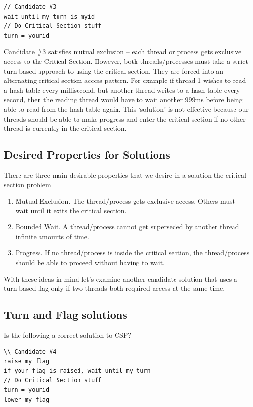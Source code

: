 \begin{lstlisting}
// Candidate #3
wait until my turn is myid
// Do Critical Section stuff
turn = yourid
\end{lstlisting}

Candidate \#3 satisfies mutual exclusion -- each thread or process gets exclusive access to the Critical Section.
However, both threads/processes must take a strict turn-based approach to using the critical section.
They are forced into an alternating critical section access pattern.
For example if thread 1 wishes to read a hash table every millisecond, but another thread writes to a hash table every second, then the reading thread would have to wait another 999ms before being able to read from the hash table again.
This `solution' is not effective because our threads should be able to make progress and enter the critical section if no other thread is currently in the critical section.

\subsection{Desired Properties for Solutions}

There are three main desirable properties that we desire in a solution the critical section problem

\begin{enumerate}
\item Mutual Exclusion. The thread/process gets exclusive access.
  Others must wait until it exits the critical section.
\item Bounded Wait. A thread/process cannot get superseded by another thread infinite amounts of time.
\item Progress. If no thread/process is inside the critical section, the thread/process should be able to proceed without having to wait.
\end{enumerate}

With these ideas in mind let's examine another candidate solution that uses a turn-based flag only if two threads both required access at the same time.

\subsection{Turn and Flag solutions}

Is the following a correct solution to CSP?

\begin{lstlisting}
\\ Candidate #4
raise my flag
if your flag is raised, wait until my turn
// Do Critical Section stuff
turn = yourid
lower my flag
\end{lstlisting}

